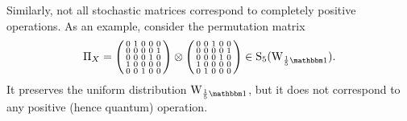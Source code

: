 Similarly, not all stochastic matrices correspond to completely positive operations.
As an example, consider the permutation matrix
\begin{equation}
    \Pi_X = \begin{psmallmatrix}
        0 & 1 & 0 & 0 & 0 \\
        0 & 0 & 0 & 0 & 1 \\
        0 & 0 & 0 & 1 & 0 \\
        1 & 0 & 0 & 0 & 0 \\
        0 & 0 & 1 & 0 & 0
    \end{psmallmatrix} \otimes \begin{psmallmatrix}
        0 & 0 & 1 & 0 & 0 \\
        0 & 0 & 0 & 0 & 1 \\
        0 & 0 & 0 & 1 & 0 \\
        1 & 0 & 0 & 0 & 0 \\
        0 & 1 & 0 & 0 & 0    
    \end{psmallmatrix} \in {\rm{S}}_5({\W{\frac{1}{5}\id}}).
\end{equation}
It preserves the uniform distribution $\W{\frac{1}{5}\id}$, but it does not correspond to any positive (hence quantum) operation.

